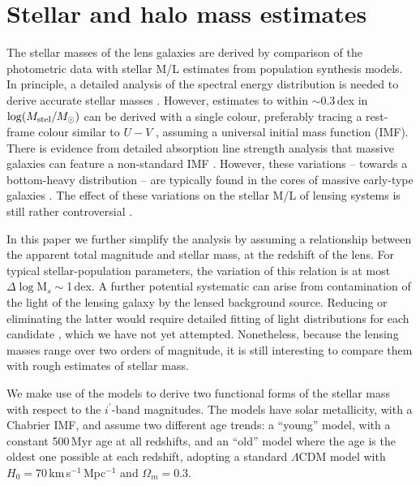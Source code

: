 
\section{Stellar and halo mass estimates}
\label{sec:stellar-mass}

The stellar masses of the lens galaxies are derived by comparison of
the photometric data with stellar M/L estimates from population
synthesis models.  In principle, a detailed analysis of the spectral
energy distribution is needed to derive accurate stellar masses
\citep[e.g.][]{2009ApJS..185..253G,2011MNRAS.418.1587T}.  However,
estimates to within $\sim$0.3\,dex in $\log(M_\text{stel}/M_\odot)$ can be derived
with a single colour, preferably tracing a rest-frame colour similar
to $U-V$ \citep[see Fig.~1 of][]{2008MNRAS.383..857F}, assuming
a universal initial mass function (IMF). There is
evidence from detailed absorption line strength analysis that massive
galaxies can feature a non-standard IMF 
\citep[e.g.][]{2013MNRAS.429L..15F}. However, these variations --
towards a bottom-heavy distribution -- are typically found in the
cores of massive early-type galaxies \citep{2016MNRAS.457.1468L}. The
effect of these variations on the stellar M/L of lensing systems is
still rather controversial
\citep{2015MNRAS.449.3441S,2016MNRAS.459.3677L}.

In this paper we further simplify the analysis by assuming a
relationship between the apparent total magnitude and stellar mass, at
the redshift of the lens.  For typical stellar-population parameters,
the variation of this relation is at most $\Delta\log$M$_s\sim$1\,dex.
A further potential systematic can arise from contamination of the
light of the lensing galaxy by the lensed background source.  Reducing
or eliminating the latter would require detailed fitting of light
distributions for each candidate \citep[see][]{2011ApJ...740...97L},
which we have not yet attempted.  Nonetheless, because the lensing
masses range over two orders of magnitude, it is still interesting to
compare them with rough estimates of stellar mass.

We make use of the \citet{2003MNRAS.344.1000B} models to derive two
functional forms of the stellar mass with respect to the $i^{\prime}$-band
magnitudes. The models have solar metallicity, with a Chabrier IMF,
and assume two different age trends: a ``young'' model, with a
constant 500\,Myr age at all redshifts, and an ``old'' model where the
age is the oldest one possible at each redshift, adopting a standard
$\Lambda$CDM model with $H_0=70$\,km\,s$^{-1}$\,Mpc$^{-1}$ and
$\Omega_m=0.3$.

